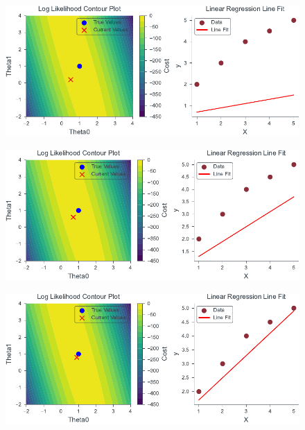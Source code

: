 \documentclass{beamer}
\begin{document}


\begin{frame}
    \begin{figure}
                \centerline{\includegraphics[scale=0.8]{../figures/mle/lin_reg_slider_1.pdf}}
\end{figure}
\end{frame}
\begin{frame}
    \begin{figure}
                \centerline{\includegraphics[scale=0.8]{../figures/mle/lin_reg_slider_2.pdf}}
\end{figure}
\end{frame}
\begin{frame}
    \begin{figure}
                \centerline{\includegraphics[scale=0.8]{../figures/mle/lin_reg_slider_3.pdf}}
\end{figure}
\end{frame}
\end{document}
